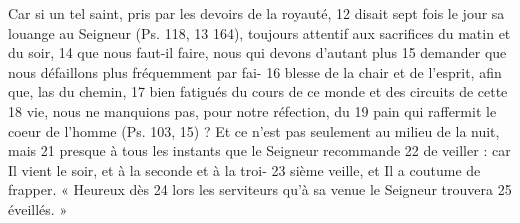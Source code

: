 Car si un tel saint, pris par les devoirs de la royauté,	 
12	 	disait sept fois le jour sa louange au Seigneur (Ps. 118,	 
13	 	164), toujours attentif aux sacrifices du matin et du soir,	 
14	 	que nous faut-il faire, nous qui devons d'autant plus	 
15	 	demander que nous défaillons plus fréquemment par fai-	 
16	 	blesse de la chair et de l'esprit, afin que, las du chemin,	 
17	 	bien fatigués du cours de ce monde et des circuits de cette	 
18	 	vie, nous ne manquions pas, pour notre réfection, du	 
19	 	pain qui raffermit le coeur de l'homme (Ps. 103, 15) ?
Et ce n'est pas seulement au milieu de la nuit, mais	 
21	 	presque à tous les instants que le Seigneur recommande	 
22	 	de veiller : car Il vient le soir, et à la seconde et à la troi-	 
23	 	sième veille, et Il a coutume de frapper. « Heureux dès	 
24	 	lors les serviteurs qu'à sa venue le Seigneur trouvera	 
25	 	éveillés. »